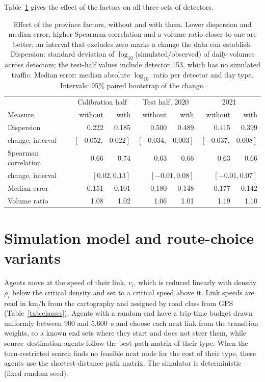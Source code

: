 \documentclass[11pt,a4paper]{article}
\begin{document}
Table~\ref{tab:province_effect} gives the effect of the factors on all three sets of detectors.

\begin{table}[htbp]
\centering
\caption{Effect of the province factors, without and with them. Lower dispersion and median error, higher Spearman correlation and a volume ratio closer to one are better; an interval that excludes zero marks a change the data can establish. Dispersion: standard deviation of $\log_{10}$(simulated/observed) of daily volumes across detectors; the test-half values include detector 153, which has no simulated traffic. Median error: median absolute $\log_{10}$ ratio per detector and day type. Intervals: 95\% paired bootstrap of the change.}
\label{tab:province_effect}
\begin{tabular}{@{}lrrrrrr@{}}
\toprule
 & \multicolumn{2}{c}{Calibration half} & \multicolumn{2}{c}{Test half, 2020} & \multicolumn{2}{c}{2021} \\
Measure & without & with & without & with & without & with \\
\midrule
Dispersion & 0.222 & 0.185 & 0.500 & 0.489 & 0.415 & 0.399 \\
\quad change, interval & \multicolumn{2}{r}{$[-0.052, -0.022]$} & \multicolumn{2}{r}{$[-0.034, -0.003]$} & \multicolumn{2}{r}{$[-0.037, -0.008]$} \\
Spearman correlation & 0.66 & 0.74 & 0.63 & 0.66 & 0.63 & 0.66 \\
\quad change, interval & \multicolumn{2}{r}{$[0.02, 0.13]$} & \multicolumn{2}{r}{$[-0.01, 0.08]$} & \multicolumn{2}{r}{$[-0.01, 0.07]$} \\
Median error & 0.151 & 0.101 & 0.180 & 0.148 & 0.177 & 0.142 \\
Volume ratio & 1.08 & 1.02 & 1.06 & 1.01 & 1.19 & 1.10 \\
\bottomrule
\end{tabular}
\end{table}

\section{Simulation model and route-choice variants}
\label{sec:routing}

Agents move at the speed of their link, $v_i$, which is reduced linearly with density $\rho_i$ below the critical density and set to a critical speed above it. Link speeds are read in km/h from the cartography and assigned by road class from GPS (Table~\ref{tab:classes}). Agents with a random end have a trip-time budget drawn uniformly between 900 and 5,600~s and choose each next link from the transition weights, so a known end sets where they start and does not steer them, while source--destination agents follow the best-path matrix of their type. When the turn-restricted search finds no feasible next node for the cost of their type, these agents use the shortest-distance path matrix. The simulator is deterministic (fixed random seed).
\end{document}
